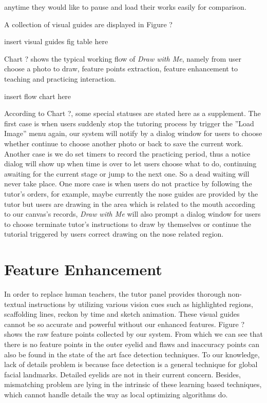 anytime they would like to pause and load their works easily for comparison.
		
		A collection of visual guides are displayed in Figure ?\\
		\begin{center}
			insert visual guides fig table here
			\end{center}
		
		Chart ? shows the typical working flow of \textit{Draw with Me}, namely from user choose a photo to draw, feature points extraction, feature enhancement to teaching and practicing interaction. \\
			\begin{center}
			insert flow chart here
			\end{center}

		According to Chart ?, some special statuses are stated here as a supplement. The first case is when users suddenly stop the tutoring process by trigger the ''Load Image'' menu again, our system will notify by a dialog window for users to choose whether continue to choose another photo or back to save the current work. Another case is we do set timers to record the practicing period, thus a notice dialog will show up when time is over to let users choose what to do, continuing awaiting for the current stage or jump to the next one. So a dead waiting will never take place. One more case is when users do not practice by following the tutor's orders, for example, maybe currently the nose guides are provided by the tutor but users are drawing in the area which is related to the mouth according to our canvas's records, \textit{Draw with Me} will also prompt a dialog window for users to choose terminate tutor's instructions to draw by themselves or continue the tutorial triggered by users correct drawing on the nose related region.

\section{Feature Enhancement} \label{sec-vg}
		In order to replace human teachers, the tutor panel provides thorough non-textual instructions by utilizing various vision cues such as highlighted regions, scaffolding lines, reckon by time and sketch animation. These visual guides cannot be so accurate and powerful without our enhanced features. Figure ? shows the raw feature points collected by our system. From which we can see that there is no feature points in the outer eyelid and flaws and inaccuracy points can also be found in the state of the art face detection techniques. To our knowledge, lack of details problem is because face detection is a general technique for global facial landmarks. Detailed eyelids are not in their current concern. Besides, mismatching problem are lying in the intrinsic of these learning based techniques, which cannot handle details the way as local optimizing algorithms do. \\
		
